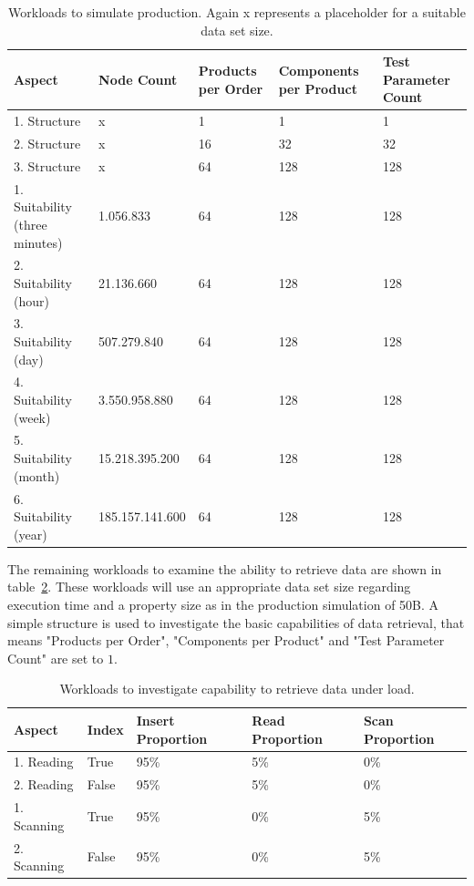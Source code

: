 \begin{table}[!h]
  \begin{minipage}{\textwidth}
    \begin{tabularx}{\textwidth}{ | X | X | X | X | X | }
      \hline
      Aspect & Node Count & Products per Order & Components per Product & Test Parameter Count \\ \hline
      1. Structure & x & 1 & 1 & 1 \\ \hline
      2. Structure & x & 16 & 32 & 32 \\ \hline
      3. Structure & x & 64 & 128 & 128 \\ \hline
      1. Suitability (three minutes) & 1.056.833 & 64 & 128 & 128 \\ \hline
      2. Suitability (hour) & 21.136.660 & 64 & 128 & 128 \\ \hline
      3. Suitability (day) & 507.279.840 & 64 & 128 & 128 \\ \hline
      4. Suitability (week) & 3.550.958.880 & 64 & 128 & 128 \\ \hline
      5. Suitability (month) & 15.218.395.200 & 64 & 128 & 128 \\ \hline
      6. Suitability (year) & 185.157.141.600 & 64 & 128 & 128 \\ \hline
    \end{tabularx}
  \end{minipage}
  \caption{Workloads to simulate production. Again x represents a placeholder for a suitable data set size.}
  \label{tab:productionSimulation}
\end{table}

The remaining workloads to examine the ability to retrieve data are shown in table~\ref{tab:retrievingUnderLoad}.
These workloads will use an appropriate data set size regarding execution time and a property size as in the production simulation of 50B.
A simple structure is used to investigate the basic capabilities of data retrieval,
that means "Products per Order",
"Components per Product" and "Test Parameter Count" are set to $ 1 $.

\begin{table}[!h]
  \begin{minipage}{\textwidth}
    \begin{tabularx}{\textwidth}{ | X | X | X | X | X | }
      \hline
      Aspect & Index & Insert Proportion & Read Proportion & Scan Proportion \\ \hline
      1. Reading & True & 95\% & 5\% & 0\% \\ \hline
      2. Reading & False & 95\% & 5\% & 0\% \\ \hline
      1. Scanning & True & 95\% & 0\% & 5\% \\ \hline
      2. Scanning & False & 95\% & 0\% & 5\% \\ \hline
    \end{tabularx}
  \end{minipage}
  \caption{Workloads to investigate capability to retrieve data under load.}
  \label{tab:retrievingUnderLoad}
\end{table}

